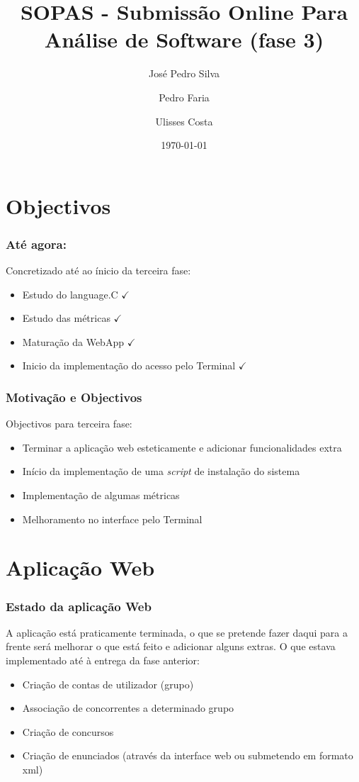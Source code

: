 \documentclass{beamer}
\title{SOPAS - Submissão Online Para Análise de Software (fase 3)}
\author{José Pedro Silva \and
Pedro Faria \and
Ulisses Costa
}
\date{\today}
\institute{Engenharia de Linguagens\\
Projecto integrado
}
\begin{document}
\begin{frame}
   \titlepage
\end{frame}

\section{Objectivos}
\begin{frame} \frametitle{Até agora:}
Concretizado até ao ínicio da terceira fase:
\begin{itemize}
\item Estudo do language.C {\color{green}$\checkmark$}
\item Estudo das métricas {\color{green}$\checkmark$}
\item Maturação da WebApp {\color{green}$\checkmark$}
\item Inicio da implementação do acesso pelo Terminal {\color{green}$\checkmark$}
\end{itemize}
\end{frame}

\begin{frame} \frametitle{Motivação e Objectivos}
Objectivos para terceira fase:
\begin{itemize}
\item Terminar a aplicação web esteticamente e adicionar funcionalidades extra
\item Início da implementação de uma \emph{script} de instalação do sistema
\item Implementação de algumas métricas
\item Melhoramento no interface pelo Terminal
\end{itemize}
\end{frame}

\section{Aplicação Web}
\begin{frame}[fragile] \frametitle{Estado da aplicação Web}
A aplicação está praticamente terminada, o que se pretende fazer daqui para a frente será melhorar o que está feito e adicionar alguns extras. O que estava implementado até à entrega da fase anterior:
\begin{itemize}
\item Criação de contas de utilizador (grupo)
\item Associação de concorrentes a determinado grupo
\item Criação de concursos
\item Criação de enunciados (através da interface web ou submetendo em formato xml)
\end{itemize}
\end{frame}
\end{document}
